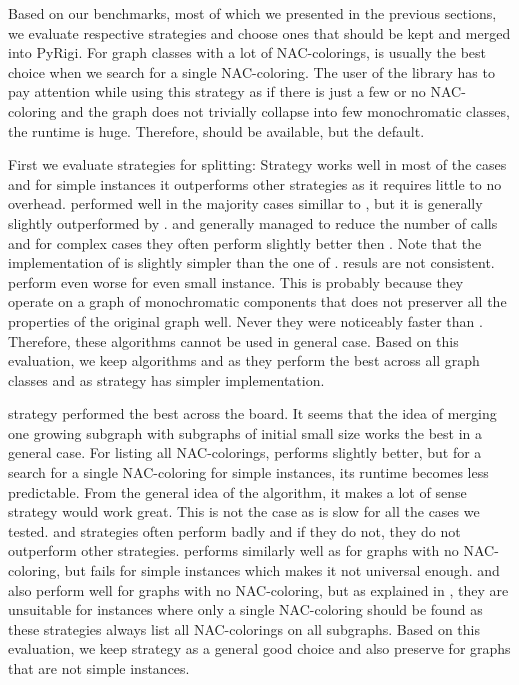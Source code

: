 Based on our benchmarks, most of which we presented in the previous sections,
we evaluate respective strategies and choose ones
that should be kept and merged into PyRigi.
For graph classes with a lot of NAC-colorings,
\NaiveCycles{} is usually the best choice
when we search for a single NAC-coloring.
%
The user of the library has to pay attention while using this strategy
as if there is just a few or no NAC-coloring and the graph does not trivially collapse
into few monochromatic classes, the runtime is huge.
Therefore, \NaiveCycles{} should be available, but the default.

First we evaluate strategies for splitting:
Strategy \None{} works well in most of the cases and for simple
instances it outperforms other strategies as it requires little to no overhead.
%
\CyclesMatchChunks{} performed well in the majority cases simillar to \None{},
but it is generally slightly outperformed by \Neighbors{}.
%
\Neighbors{} and \NeighborsDegree{} generally managed to reduce the number
of \IsNACColoring{} calls and for complex cases they often
perform slightly better then \None{}.
Note that the implementation of \Neighbors{} is slightly simpler than
the one of \NeighborsDegree{}.
%
\KernighanLin{} resuls are not consistent.
\Cuts{} perform even worse for even small instance.
This is probably because they operate on a graph of monochromatic
components that does not preserver all the properties
of the original graph well.
Never they were noticeably faster than \Neighbors{}.
Therefore, these algorithms cannot be used in general case.
%
Based on this evaluation, we keep algorithms \None{} and \Neighbors{}
as they perform the best across all graph classes and
as \Neighbors{} strategy has simpler implementation.

\MergeLinear{} strategy performed the best across the board.
It seems that the idea of merging one growing subgraph
with subgraphs of initial small size works the best
in a general case.
%
For listing all NAC-colorings, \SharedVertices{} performs
slightly better, but for a search for a single NAC-coloring for simple instances,
its runtime becomes less predictable.
%
From the general idea of the \Subgraphs{} algorithm,
it makes a lot of sense \Log{} strategy would work great.
This is not the case as \Log{} is slow for all the cases we tested.
%
\MinMax{} and \SortedBits{} strategies often perform badly
and if they do not, they do not outperform other strategies.
%
\PromisingCycles{} performs similarly well as \Neighbors{}
for graphs with no NAC-coloring,
but fails for simple instances which makes it not universal enough.
%
\SortedSize{} and \Score{} also perform well for graphs with no NAC-coloring,
but as explained in ,
they are unsuitable for instances where only a single NAC-coloring
should be found as these strategies always list all NAC-colorings
on all subgraphs.
%
Based on this evaluation, we keep strategy \MergeLinear{} as a general good choice
and also preserve \SharedVertices{} for graphs that are not simple instances.

